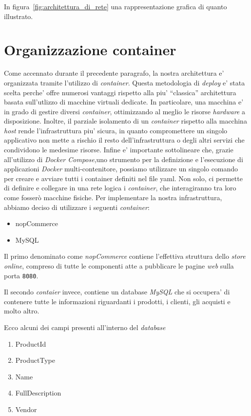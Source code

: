 \documentclass[a4paper]{report}
\newcommand{\quotes}[1]{``#1''}
\begin{document}
		In figura~\ref{fig:architettura_di_rete} una rappresentazione grafica di quanto illustrato.

	\section{Organizzazione container}\label{organizzazione_container}
		Come accennato durante il precedente paragrafo, la nostra architettura e' organizzata tramite l'utilizzo di
		\emph{container}. Questa metodologia di  \emph{deploy} e' stata scelta perche' offre numerosi vantaggi rispetto
		alla piu' \quotes{classica} architettura basata sull'utlizzo di macchine virtuali dedicate. In particolare, una
		macchina e' in grado di gestire diversi \emph{container}, ottimizzando al meglio le risorse
		\emph{hardware} a disposizione. Inoltre, il parziale isolamento di un \emph{container} rispetto alla macchina
		\emph{host} rende l'infrastruttura piu' sicura, in quanto compromettere un singolo applicativo non mette a
		rischio il resto dell'infrastruttura o degli altri servizi che condividono le medesime risorse.
		Infine e' importante sottolineare che, grazie all'utilizzo di \emph{Docker Compose},uno strumento per la 
		definizione e l'esecuzione di applicazioni \emph{Docker} multi-contenitore, possiamo utilizzare un singolo comando per
		creare e avviare tutti i container definiti nel file yaml. Non solo, ci permette di definire e collegare in una
		rete logica i \emph{container}, che interagiranno tra loro come fosserò macchine fisiche.
		Per implementare la nostra infrastruttura, abbiamo deciso di utilizzare i seguenti \emph{container}:
		\begin{itemize}
			\item nopCommerce
			\item MySQL
		\end{itemize}
		Il primo denominato come \emph{nopCommerce} contiene l'effettiva struttura dello \emph{store online}, compreso
		di tutte le componenti atte a pubblicare le pagine \emph{web} sulla porta \texttt{8080}.
		
		Il secondo \emph{contaier} invece, contiene un database \emph{MySQL} che si occupera' di contenere tutte le
		informazioni riguardanti i prodotti, i clienti, gli acquisti e molto altro.
		
		Ecco alcuni dei campi presenti all'interno del \emph{database}
		\begin{enumerate}
			\item ProductId
			\item ProductType
			\item Name
			\item FullDescription
			\item Vendor
		\end{enumerate}
\end{document}
